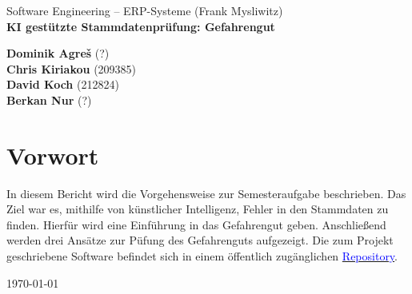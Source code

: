 \begin{titlepage}
    \begin{flushleft}
        Software Engineering -- ERP-Systeme (Frank Mysliwitz)\\

        \huge
        \textbf{KI gestützte Stammdatenprüfung: Gefahrengut}\\
        \vspace{1,5cm}

        \Large
        \textbf{Dominik Agreš} {\small (?)}\\
        \textbf{Chris Kiriakou} {\small (209385)}\\
        \textbf{David Koch} {\small (212824)}\\
        \textbf{Berkan Nur} {\small (?)}\\
        \vspace{1,5cm}
        
        \large
        \section*{Vorwort}
        In diesem Bericht wird die Vorgehensweise zur Semesteraufgabe beschrieben.
        Das Ziel war es, mithilfe von künstlicher Intelligenz, Fehler in den Stammdaten zu
        finden. Hierfür wird eine Einführung in das Gefahrengut geben. Anschließend werden
        drei Ansätze zur Püfung des Gefahrenguts aufgezeigt. 
        Die zum Projekt geschriebene Software befindet sich in einem öffentlich 
        zugänglichen \href{https://github.com/ckiri/gg}{\textcolor{blue}{Repository}}.\\

        \vspace{2,5cm}

        \today \\

        \vspace{3,5cm}
    \end{flushleft}
\end{titlepage}
